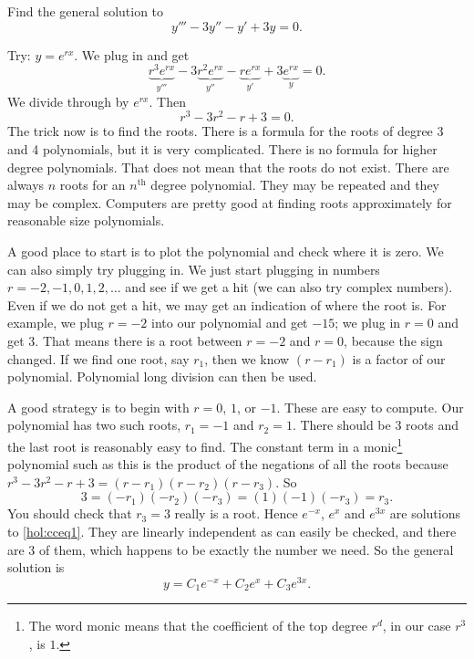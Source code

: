 \begin{example}
Find the general solution to
\begin{equation} \label{hol:cceq1}
y''' - 3 y'' - y' + 3y = 0 .
\end{equation}

Try: $y = e^{rx}$.  We plug in and get
\begin{equation*}
\underbrace{r^3 e^{rx}}_{y'''} - 3 \underbrace{r^2 e^{rx}}_{y''} -
\underbrace{r e^{rx}}_{y'} + 3 \underbrace{e^{rx}}_{y} = 0 .
\end{equation*}
We divide through by $e^{rx}$.  Then 
\begin{equation*}
r^3 - 3 r^2 - r + 3 = 0 .
\end{equation*}
The trick now is to find the roots.  There is a formula for the roots of
degree 3 and 4 polynomials, but it is very complicated.  There is no formula
for higher degree polynomials.  That does not mean that the roots do not
exist.  There are always
$n$ roots for an $n^{\text{th}}$ degree polynomial.  They may be
repeated
and they may be complex.  Computers are pretty good at finding roots
approximately for reasonable size polynomials.

A good place to start is to plot the polynomial and check where it is zero.
We can also simply try plugging in.  We
just start plugging
in numbers $r=-2,-1,0,1,2,\ldots$ and see if we get a hit (we can also
try complex numbers).  Even
if we do not get a hit, we may get an indication
of where the root is.  For example, we plug
$r=-2$ into our polynomial and get $-15$; we plug in $r=0$ and get $3$.
That means there is a root between $r=-2$ and $r=0$,
because the sign changed.
If we find one root, say $r_1$, then we know $(r-r_1)$ is a factor
of our polynomial.  Polynomial long division can then be used.

A good strategy is to begin with $r=0$, $1$, or $-1$.  These are
easy to compute.  Our polynomial has
two such roots, $r_1 = -1$
and $r_2 = 1$.  There should be 3 roots and the last root is reasonably
easy to find.  The constant
term in a monic\footnote{The word monic means that the coefficient of the
top degree $r^d$, in our case $r^3$, is $1$.}
polynomial such as this is the product of the negations of all the roots
because $r^3 - 3 r^2 - r + 3 = (r-r_1)(r-r_2)(r-r_3)$.
So
\begin{equation*}
3 = (-r_1)(-r_2)(-r_3) = (1)(-1)(-r_3) = r_3 .
\end{equation*}
You should check that $r_3 = 3$ really
is a root.  Hence $e^{-x}$, $e^{x}$
and $e^{3x}$ are solutions to \eqref{hol:cceq1}.  They are linearly independent
as can easily be checked, and there are 3 of them, which happens to be exactly
the number we need.  So the general solution is
\begin{equation*}
y = C_1 e^{-x} + C_2 e^{x} + C_3 e^{3x} .
\end{equation*}


\end{example}
